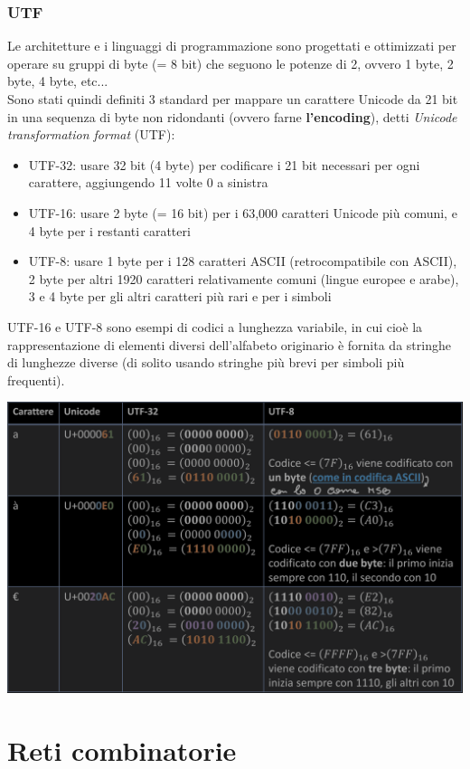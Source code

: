 \documentclass{article}
\begin{document}
\subsubsection{UTF}
Le architetture e i linguaggi di programmazione sono progettati e ottimizzati per operare su gruppi di byte (= 8 bit) che seguono le potenze di 2, ovvero 1 byte, 2 byte, 4 byte, etc...\\
Sono stati quindi definiti 3 standard per mappare un carattere Unicode da 21 bit in una sequenza di byte non ridondanti (ovvero farne \textbf{l'encoding}), detti \textit{Unicode transformation format} (UTF):
\begin{itemize}
    \item UTF-32: usare 32 bit (4 byte) per codificare i 21 bit necessari per ogni carattere, aggiungendo 11 volte 0 a sinistra
    \item UTF-16: usare 2 byte (= 16 bit) per i 63,000 caratteri Unicode più comuni, e 4 byte per i restanti caratteri
    \item UTF-8: usare 1 byte per i 128 caratteri ASCII (retrocompatibile con ASCII), 2 byte per altri 1920 caratteri relativamente comuni (lingue europee e arabe), 3 e 4 byte per gli altri caratteri più rari e per i simboli
\end{itemize}
UTF-16 e UTF-8 sono esempi di codici a lunghezza variabile, in cui cioè la
rappresentazione di elementi diversi dell’alfabeto originario è fornita da stringhe di
lunghezze diverse (di solito usando stringhe più brevi per simboli più frequenti).
\begin{center}
    \includegraphics[scale=0.35]{utf32utf8.png}
\end{center}
\section{Reti combinatorie}
\end{document}
